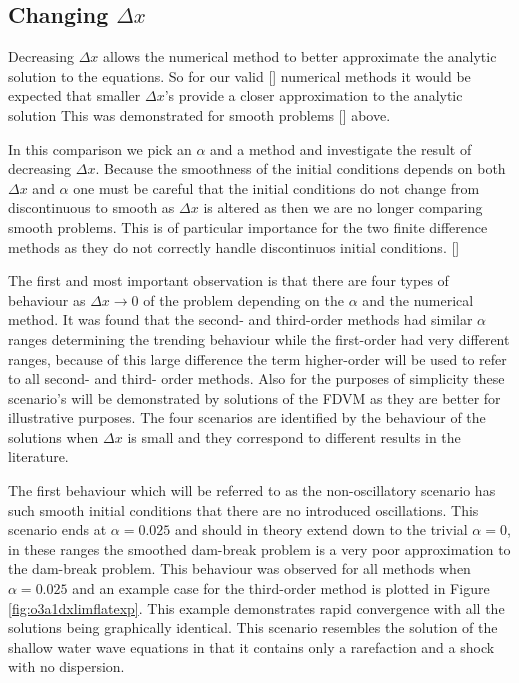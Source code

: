 \documentclass[SingleSpace,12pt,Proceedings]{Serre_ASCE}
\begin{document}
\subsection{Changing $\Delta x$}
Decreasing $\Delta x$ allows the numerical method to better approximate the analytic solution to the equations. So for our valid [] numerical methods it would be expected that smaller $\Delta x$'s provide a closer approximation to the analytic solution This was demonstrated for smooth problems [] above.

In this comparison we pick an $\alpha$ and a method and investigate the result of decreasing $\Delta x$. Because the smoothness of the initial conditions depends on both $\Delta x$ and $\alpha$ one must be careful that the initial conditions do not change from discontinuous to smooth as $\Delta x$ is altered as then we are no longer comparing smooth problems. This is of particular importance for the two finite difference methods as they do not correctly handle discontinuos initial conditions. [] 

The first and most important observation is that there are four types of behaviour as $\Delta x \rightarrow 0$ of the problem depending on the $\alpha$ and the numerical method. It was found that the second- and third-order methods had similar $\alpha$ ranges determining the trending behaviour while the first-order had very different ranges, because of this large difference the term higher-order will be used to refer to all second- and third- order methods. Also for the purposes of simplicity these scenario's will be demonstrated by solutions of the FDVM as they are better for illustrative purposes. The four scenarios are identified by the behaviour of the solutions when $\Delta x$ is small and they correspond to different results in the literature. 

The first behaviour which will be referred to as the non-oscillatory scenario has such smooth initial conditions that there are no introduced oscillations. This scenario ends at $\alpha = 0.025$ and should in theory extend down to the trivial $\alpha = 0$, in these ranges the smoothed dam-break problem is a very poor approximation to the dam-break problem. This behaviour was observed for all methods when $\alpha = 0.025$ and an example case for the third-order method is plotted in Figure \ref{fig:o3a1dxlimflatexp}. This example demonstrates rapid convergence with all the solutions being graphically identical. This scenario resembles the solution of the shallow water wave equations in that it contains only a rarefaction and a shock with no dispersion. 
\end{document}
